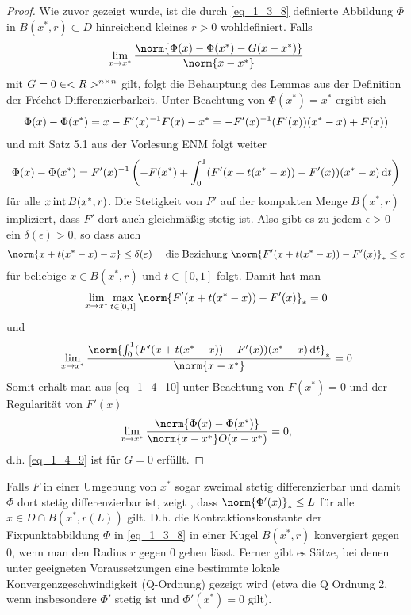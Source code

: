 \begin{proof}
	Wie zuvor gezeigt wurde, ist die durch \cref{eq_1_3_8} definierte Abbildung $\Phi$ in $B(x^{\ast},r)\subset D$ hinreichend kleines $r>0$ wohldefiniert. Falls
	\begin{align}
		\lim_{x\to x^{\ast}} \frac{\norm{\Phi(x) - \Phi(x^{\ast}) - G(x-x^{\ast})}}{\norm{x-x^{\ast}}} \label{eq_1_4_9}
	\end{align}
	mit $G = 0\in <R>^{n \times n}$ gilt, folgt die Behauptung des Lemmas aus der Definition der Fréchet-Differenzierbarkeit. Unter Beachtung von $\Phi(x^{\ast}) = x^{\ast}$ ergibt sich
	\begin{align}
	\Phi(x) - \Phi(x^{\ast}) = x - F'(x)^{-1}F(x) - x^{\ast} = -F'(x)^{-1}(F'(x))(x^{\ast}-x)+F(x))\notag
	\end{align}
	und mit Satz 5.1 aus der Vorlesung ENM folgt weiter
	\begin{align}
		\Phi(x) - \Phi(x^{\ast}) = F'(x)^{-1}\left( -F(x^{\ast}) + \int_{0}^{1} (F'(x+t(x^{\ast}-x)) - F'(x))(x^{\ast}-x)\,\mathrm{d} t\right)\label{eq_1_4_10}
	\end{align}
	für alle $x \operatorname{int} B(x^{\ast},r)$. Die Stetigkeit von $F'$ auf der kompakten Menge $B(x^{\ast},r)$ impliziert, dass $F'$ dort auch gleichmäßig stetig ist. Also gibt es zu jedem $\epsilon > 0$ ein $\delta(\epsilon) > 0$, so dass auch
	\begin{align}
		\norm{x+t(x^{\ast}-x) - x}\le \delta(\epsilon) \quad \text{ die Beziehung } \norm{F'(x+t(x^{\ast}-x)) -F'(x)}_{\ast} \le \epsilon\notag
	\end{align}
	für beliebige $x \in B(x^{\ast},r)$ und $t \in [0,1]$ folgt. Damit hat man
	\begin{align}
		\lim_{x\to x^{\ast}}\max_{t\in[0,1]} \norm{F'(x+t(x^{\ast}-x)) -F'(x)}_{\ast} = 0 \notag
	\end{align}
	und
	\begin{align}
		\lim_{x\to x^{\ast}} \frac{\norm{\int_{0}^{1} (F'(x+t(x^{\ast} - x)) -F'(x))(x^{\ast}-x)\diff t}_{\ast}}{\norm{x-x^{\ast}}} = 0 \notag
	\end{align}
	Somit erhält man aus \cref{eq_1_4_10} unter Beachtung von $F(x^{\ast}) = 0$ und der Regularität von $F'(x)$
	\begin{align}
		\lim_{x\to x^{\ast}} \frac{\norm{\Phi(x) - \Phi(x^{\ast})}}{\norm{x-x^{\ast}}O(x-x^{\ast})} = 0,\notag
	\end{align} %
	d.h. \cref{eq_1_4_9} ist für $G=0$ erfüllt.
\end{proof}

\begin{remark}
	Falls $F$ in einer Umgebung von $x^{\ast}$ sogar zweimal stetig differenzierbar und damit $\Phi$ dort stetig differenzierbar ist, zeigt , dass $\norm{\Phi'(x)}_{\ast} \le L$ für alle $x \in D \cap B(x^{\ast},r(L))$ gilt. D.h. die Kontraktionskonstante der Fixpunktabbildung $\Phi$ in \cref{eq_1_3_8} in einer Kugel $B(x^{\ast},r)$ konvergiert gegen $0$, wenn man den Radius $r$ gegen $0$ gehen lässt. Ferner gibt es Sätze, bei denen unter geeigneten Voraussetzungen eine bestimmte lokale Konvergenzgeschwindigkeit (Q-Ordnung) gezeigt wird (etwa die Q Ordnung $2$, wenn insbesondere $\Phi'$ stetig ist und $\Phi'(x^{\ast}) = 0$ gilt).
\end{remark}